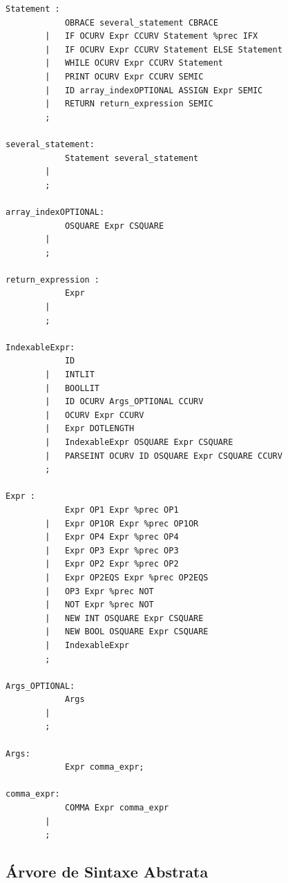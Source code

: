 \documentclass[12pt]{article}
\begin{document}
\begin{lstlisting}
Statement : 
            OBRACE several_statement CBRACE                     
        |   IF OCURV Expr CCURV Statement %prec IFX             
        |   IF OCURV Expr CCURV Statement ELSE Statement        
        |   WHILE OCURV Expr CCURV Statement                    
        |   PRINT OCURV Expr CCURV SEMIC                        
        |   ID array_indexOPTIONAL ASSIGN Expr SEMIC            
        |   RETURN return_expression SEMIC                      
        ;

several_statement:
            Statement several_statement     
        |                                       
        ;

array_indexOPTIONAL:
            OSQUARE Expr CSQUARE        
        |                                   
        ;

return_expression : 
            Expr    
        |               
        ;

IndexableExpr: 
            ID                                                  
        |   INTLIT                                              
        |   BOOLLIT                                             
        |   ID OCURV Args_OPTIONAL CCURV                        
        |   OCURV Expr CCURV                                    
        |   Expr DOTLENGTH                                      
        |   IndexableExpr OSQUARE Expr CSQUARE                  
        |   PARSEINT OCURV ID OSQUARE Expr CSQUARE CCURV        
        ;

Expr : 
            Expr OP1 Expr %prec OP1                 
        |   Expr OP1OR Expr %prec OP1OR             
        |   Expr OP4 Expr %prec OP4                 
        |   Expr OP3 Expr %prec OP3                 
        |   Expr OP2 Expr %prec OP2                 
        |   Expr OP2EQS Expr %prec OP2EQS           
        |   OP3 Expr %prec NOT                      
        |   NOT Expr %prec NOT                      
        |   NEW INT OSQUARE Expr CSQUARE            
        |   NEW BOOL OSQUARE Expr CSQUARE           
        |   IndexableExpr                           
        ;

Args_OPTIONAL:
            Args    
        |               
        ;

Args:
            Expr comma_expr;

comma_expr: 
            COMMA Expr comma_expr       
        |                                  
        ;
\end{lstlisting}


\pagebreak
\subsection{Árvore de Sintaxe Abstrata}
\end{document}
